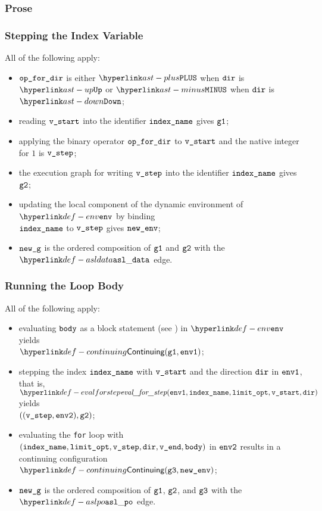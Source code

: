 \subsubsection{Prose}
\subsubsection{Stepping the Index Variable}
All of the following apply:
\begin{itemize}
  \item $\texttt{op\_for\_dir}$ is either $\PLUS$ when $\texttt{dir}$ is $\UP$ or $\MINUS$ when $\texttt{dir}$ is $\DOWN$;
  \item reading $\texttt{v\_start}$ into the identifier $\texttt{index\_name}$ gives $\texttt{g1}$;
  \item applying the binary operator $\texttt{op\_for\_dir}$ to $\texttt{v\_start}$ and the native integer for $1$ is $\texttt{v\_step}$;
  \item the execution graph for writing $\texttt{v\_step}$ into the identifier $\texttt{index\_name}$ gives $\texttt{g2}$;
  \item updating the local component of the dynamic environment of $\env$ by binding \\ $\texttt{index\_name}$ to $\texttt{v\_step}$
  gives $\texttt{new\_env}$;
  \item $\texttt{new\_g}$ is the ordered composition of $\texttt{g1}$ and $\texttt{g2}$ with the $\asldata$ edge.
\end{itemize}

\subsubsection{Running the Loop Body}
All of the following apply:
\begin{itemize}
  \item evaluating $\texttt{body}$ as a block statement (see ) in $\env$
        yields \\ $\Continuing(\vgone, \envone)$\ProseTerminateAs{\ReturningConfig, \ThrowingConfig, \DynErrorConfig};
  \item stepping the index $\texttt{index\_name}$ with $\texttt{v\_start}$ and the direction $\texttt{dir}$ in $\texttt{env1}$,
        that is, $\evalforstep(\envone, \vindexname, \vlimitopt, \vstart, \dir)$ yields \\
        $((\texttt{v\_step}, \texttt{env2}), \texttt{g2})$;
  \item evaluating the \texttt{for} loop with $(\texttt{index\_name}, \texttt{limit\_opt}, \texttt{v\_step}, \texttt{dir}, \texttt{v\_end}, \texttt{body})$
        in $\texttt{env2}$ results in a continuing configuration $\Continuing(\vgthree, \newenv)$\ProseTerminateAs{\ReturningConfig, \ThrowingConfig, \DynErrorConfig};
  \item $\texttt{new\_g}$ is the ordered composition of $\texttt{g1}$, $\texttt{g2}$, and $\texttt{g3}$ with the $\aslpo$
        edge.
\end{itemize}

